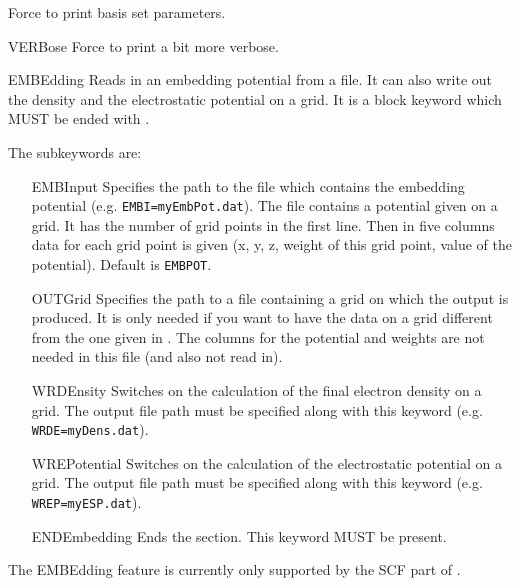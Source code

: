 \begin{keywordlist}
Force  to print basis set parameters.
\item[VERBose]
Force  to print a bit more verbose.
\item[EMBEdding]
Reads in an embedding potential from a file. It can also write out the
density and the electrostatic potential on a grid. It is a block keyword
which MUST be ended with .

The subkeywords are:
\begin{itemize}
\item[EMBInput]
Specifies the path to the file which contains the embedding potential
(e.g. {\tt EMBI=myEmbPot.dat}). The file contains a potential given on a grid. It
has the number of grid points in the first line. Then in five columns
data for each grid point is given (x, y, z, weight of this grid point,
value of the potential). Default is {\tt EMBPOT}.
\item[OUTGrid]
Specifies the path to a file containing a grid on which the output is
produced. It is only needed if you want to have the data on a grid different
from the one given in . The columns for the potential and weights
are not needed in this file (and also not read in).
\item[WRDEnsity]
Switches on the calculation of the final electron density on a grid. The
output file path must be specified along with this keyword (e.g. {\tt WRDE=myDens.dat}).
\item[WREPotential]
Switches on the calculation of the electrostatic potential on a grid. The
output file path must be specified along with this keyword (e.g. {\tt WREP=myESP.dat}).
\item[ENDEmbedding]
Ends the  section. This keyword MUST be present.
\end{itemize}
The EMBEdding feature is currently only supported by the SCF part of \molcas.
\end{keywordlist}

